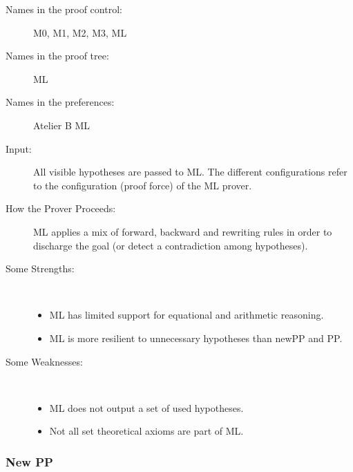 \begin{description}
	\item[Names in the proof control:] M0, M1, M2, M3, ML
	\item[Names in the proof tree:] ML
	\item[Names in the preferences:] Atelier B ML
	\item[Input:] All visible hypotheses are passed to ML. The different configurations refer to the configuration (proof force) of the ML prover.
	\item[How the Prover Proceeds:] ML applies a mix of forward, backward and rewriting rules in order to discharge the goal (or detect a contradiction among hypotheses).
	\item[Some Strengths:] ~
	\begin{itemize}
		\item ML has limited support for equational and arithmetic reasoning.
		\item ML is more resilient to unnecessary hypotheses than newPP and PP. 
	\end{itemize}
	\item[Some Weaknesses:] ~
	\begin{itemize}
		\item ML does not output a set of used hypotheses.
		\item Not all set theoretical axioms are part of ML. 
	\end{itemize}
\end{description}


\subsubsection{New PP}

